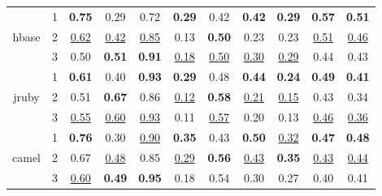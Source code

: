 \documentclass[authoryear,final,5p,times,twocolumn]{elsarticle}
\theoremstyle{plain}
\begin{document}
\begin{table}[!htbp]
{\begin{tabular}{c c c c c c c c c c c}
\multirow{3}{*}{hbase}
 & 1 & \textbf{0.75} & 0.29 & 0.72 & \textbf{0.29} & {0.42} & \textbf{0.42} & \textbf{0.29} & \textbf{0.57} & \textbf{0.51} \\
 & 2 & \underline{0.62} & \underline{0.42} & \underline{0.85} & 0.13 & \textbf{0.50} & {0.23} & 0.23 & \underline{0.51} & \underline{0.46} \\
 & 3 & 0.50 & \textbf{0.51} & \textbf{0.91} & \underline{0.18} & \underline{0.50} & \underline{0.30} & \underline{0.29} & {0.44} & 0.43 \\
\midrule
\multirow{3}{*}{jruby}
 & 1 & \textbf{0.61} & 0.40 & \textbf{0.93} & \textbf{0.29} & 0.48 & \textbf{0.44} & \textbf{0.24} & \textbf{0.49} & \textbf{0.41} \\
 & 2 & 0.51 & \textbf{0.67} & 0.86 & \underline{0.12} & \textbf{0.58} & \underline{0.21} & \underline{0.15} & 0.43 & 0.34 \\
 & 3 & \underline{0.55} & \underline{0.60} & \underline{0.93} & 0.11 & \underline{0.57} & 0.20 & 0.13 & \underline{0.46} & \underline{0.36} \\
\midrule


\multirow{3}{*}{camel}
& 1 & \textbf{0.76} & 0.30 & \underline{0.90} & \textbf{0.35} & 0.43 & \textbf{0.50} & \underline{0.32} & \textbf{0.47} & \textbf{0.48} \\
& 2 & 0.67 & \underline{0.48} & 0.85 & \underline{0.29} & \textbf{0.56} & \underline{0.43} & \textbf{0.35} & \underline{0.43} & \underline{0.44} \\
& 3 & \underline{0.60} & \textbf{0.49} & \textbf{0.95} & {0.18} & \underline{}{0.54} & 0.30 & {0.27} & {0.40} & {0.41} \\

\bottomrule
\end{tabular}
}
\end{table}
\end{document}
